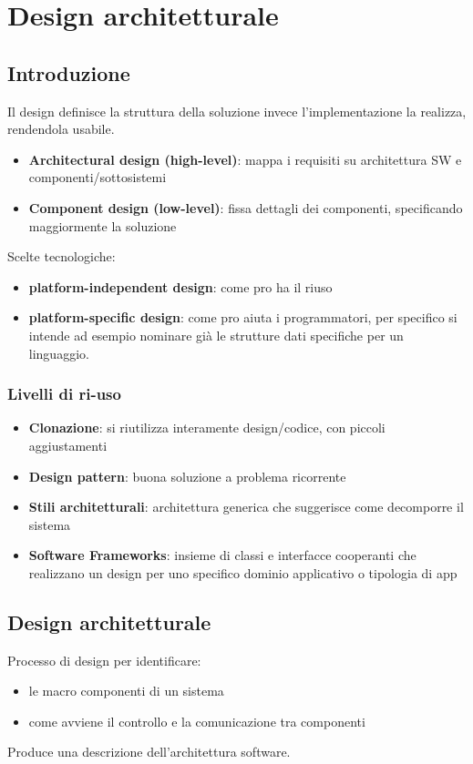 \documentclass[12pt, a4paper]{report}
\begin{document}
\chapter{Design architetturale}
\section{Introduzione}
Il design definisce la struttura della soluzione invece l'implementazione la realizza, rendendola usabile.
\begin{itemize}
    \item \textbf{Architectural design (high-level)}: mappa i requisiti su architettura SW e componenti/sottosistemi
    \item \textbf{Component design (low-level)}: fissa dettagli dei componenti, specificando maggiormente la soluzione
\end{itemize}
Scelte tecnologiche:
\begin{itemize}
    \item \textbf{platform-independent design}: come pro ha il riuso
    \item \textbf{platform-specific design}: come pro aiuta i programmatori, per specifico si intende ad esempio nominare già le strutture dati specifiche per un linguaggio.
\end{itemize}
\subsection{Livelli di ri-uso}
\begin{itemize}
    \item \textbf{Clonazione}: si riutilizza interamente design/codice, con piccoli aggiustamenti
    \item \textbf{Design pattern}: buona soluzione a problema ricorrente
    \item \textbf{Stili architetturali}: architettura generica che suggerisce come decomporre il sistema
    \item \textbf{Software Frameworks}: insieme di classi e interfacce cooperanti che realizzano un design per uno specifico dominio applicativo o tipologia di app
\end{itemize}
\section{Design architetturale}
Processo di design per identificare:
\begin{itemize}
    \item le macro componenti di un sistema
    \item come avviene il controllo e la comunicazione tra componenti
\end{itemize}
Produce una descrizione dell'architettura software.
\end{document}
